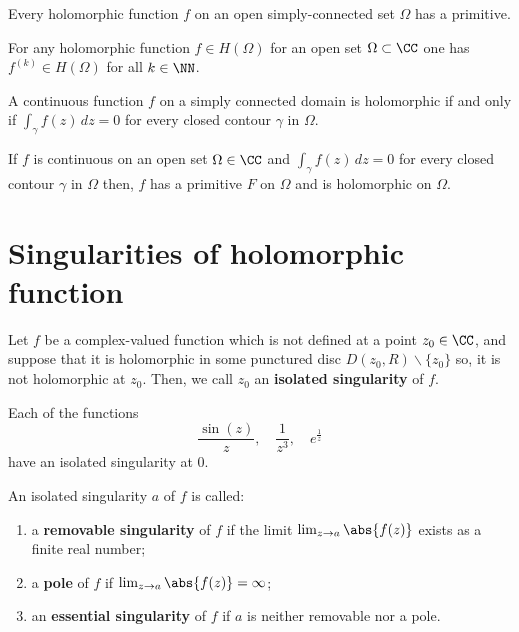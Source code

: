 \documentclass[12pt, a4paper]{article}
\begin{document}
\begin{mdcor}
    Every holomorphic function \(f\) on an open simply-connected set \(\Omega\) has a primitive.
\end{mdcor}

\begin{corollary}
    For any holomorphic function \(f \in H(\Omega)\) for an open set \(\Omega \subset \CC\) one has \(f^{(k)} \in H(\Omega)\) for all \(k \in \NN\). 
\end{corollary}

\begin{corollary}
    A continuous function \(f\) on a simply connected domain is holomorphic if and only if \(\int_{\gamma} f(z) \, dz=0\) for every closed contour \(\gamma\) in \(\Omega\).
\end{corollary}

\begin{mdthm}
    If \(f\) is continuous on an open set \(\Omega \in \CC\) and \(\int_{\gamma} f(z) \, dz=0\) for every closed contour \(\gamma\) in \(\Omega\) then, \(f\) has a primitive \(F\) on \(\Omega\) and is holomorphic on \(\Omega\).
\end{mdthm}

\section{Singularities of holomorphic function}

\begin{definition}
    Let \(f\) be a complex-valued function which is not defined at a point \(z_0 \in \CC\), and suppose that it is holomorphic in some punctured disc \(D(z_0,R) \backslash \{z_0\}\) so, it is not holomorphic at \(z_0\). Then, we call \(z_0\) an \textbf{isolated singularity} of \(f\).
\end{definition}

\begin{example}
    Each of the functions 
    \[\frac{\sin(z)}{z}, \quad \frac{1}{z^3}, \quad  e^{\frac{1}{z}}\]
    have an isolated singularity at \(0\). 
\end{example}

\begin{definition}
    An isolated singularity \(a\) of \(f\) is called:
    \begin{enumerate}
        \item a \textbf{removable singularity} of \(f\) if the limit \(\lim_{z\to a}\abs{f(z)}\) exists as a finite real number;
        \item a \textbf{pole} of \(f\) if \(\lim_{z\to a} \abs{f(z)}=\infty\);
        \item an \textbf{essential singularity} of \(f\) if \(a\) is neither removable nor a pole.
    \end{enumerate}
\end{definition}
\end{document}
